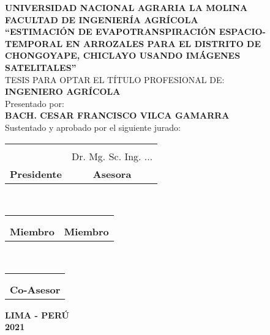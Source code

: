 \begin{center}
\thispagestyle{empty}
 {\fontsize{18pt}{ \baselineskip}\selectfont \textbf{UNIVERSIDAD NACIONAL AGRARIA LA MOLINA}}\\[0.25cm]
 {\fontsize{16pt}{ \baselineskip}\selectfont \textbf{FACULTAD DE INGENIERÍA AGRÍCOLA}}\\[1cm]
 {\fontsize{16pt}{ \baselineskip}\selectfont \textbf{``ESTIMACIÓN DE EVAPOTRANSPIRACIÓN ESPACIO-TEMPORAL EN ARROZALES PARA EL DISTRITO DE CHONGOYAPE, CHICLAYO USANDO IMÁGENES SATELITALES''}}\\[0.5cm]
 {\fontsize{16pt}{ \baselineskip}\selectfont TESIS PARA OPTAR EL TÍTULO PROFESIONAL DE:}\\[0.5cm]
 {\fontsize{16pt}{ \baselineskip}\selectfont\textbf{INGENIERO AGRÍCOLA}}\\[0.5cm]
 {\fontsize{14pt}{ \baselineskip}\selectfont Presentado por:} \\[0.5cm]
 {\fontsize{16pt}{ \baselineskip}\selectfont \textbf{BACH. CESAR FRANCISCO VILCA GAMARRA}}\\[0.5cm]
 {\fontsize{14pt}{ \baselineskip}\selectfont Sustentado y aprobado por el siguiente jurado:}\\[1cm]
\begin{minipage}{\linewidth}
\centering
\singlespacing
\begin{tabular}{cc}
\hrulefill & \hrulefill \\
 {\fontsize{10pt}{ \baselineskip}\selectfont{Dr. ...}} &  {\fontsize{10pt}{ \baselineskip}\selectfont Dr. Mg. Sc. Ing. ...} \\
\small{\textbf{Presidente}} & \small{\textbf{Asesora}}
\end{tabular}\\[1cm]
\begin{tabular}{cc}
\hrulefill & \hrulefill \\
{\fontsize{10pt}{ \baselineskip}\selectfont{Mg. Sc. ...}} & {\fontsize{10pt}{ \baselineskip}\selectfont{Mg. Sc. ...}} \\
\small{\textbf{Miembro}} & \small{\textbf{Miembro}}
\end{tabular}\\[1cm]
\begin{tabular}{c}
\hrulefill \\
{\fontsize{10pt}{ \baselineskip}\selectfont{Ing. ...}} \\
\small{\textbf{Co-Asesor}} 
\end{tabular}
\end{minipage}
\vfill
{\fontsize{14pt}{ \baselineskip}\selectfont \textbf{LIMA - PERÚ}}\\[0.5cm]
{\fontsize{14pt}{ \baselineskip}\selectfont \textbf{2021}}
\singlespacing
\end{center}